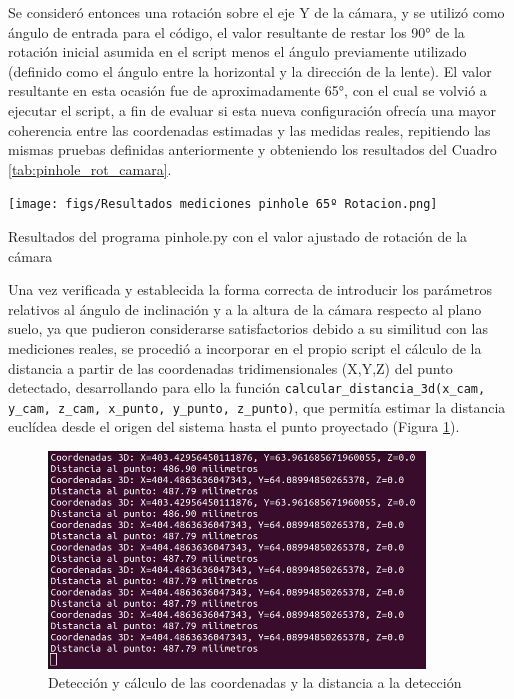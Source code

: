 Se consideró entonces una rotación sobre el eje Y de la cámara, y se utilizó como ángulo de entrada para el código, el valor resultante de restar los 90° de la rotación inicial asumida en el script menos el ángulo previamente utilizado (definido como el ángulo entre la horizontal y la dirección de la lente). El valor resultante en esta ocasión fue de aproximadamente 65°, con el cual se volvió a ejecutar el script, a fin de evaluar si esta nueva configuración ofrecía una mayor coherencia entre las coordenadas estimadas y las medidas reales, repitiendo las mismas pruebas definidas anteriormente y obteniendo los resultados del Cuadro \ref{tab:pinhole_rot_camara}.

   \begin{table}[H]
   \centering
   \begin{center}
     \texttt{[image: figs/Resultados mediciones pinhole 65º Rotacion.png]}
   \end{center}
   \caption{Resultados del programa pinhole.py con el valor ajustado de rotación de la cámara}
   \label{tab:pinhole_rot_camara}
  \end{table}
  
Una vez verificada y establecida la forma correcta de introducir los parámetros relativos al ángulo de inclinación y a la altura de la cámara respecto al plano suelo, ya que pudieron considerarse satisfactorios debido a su similitud con las mediciones reales, se procedió a incorporar en el propio script el cálculo de la distancia a partir de las coordenadas tridimensionales (X,Y,Z) del punto detectado, desarrollando para ello la función \texttt{calcular\_distancia\_3d(x\_cam, y\_cam, z\_cam, x\_punto, y\_punto, z\_punto)}, que permitía estimar la distancia euclídea desde el origen del sistema hasta el punto proyectado (Figura \ref{fig:dist_camara}). 

   \begin{figure}[H]
    \begin{center}
      \subcapcentertrue
      \includegraphics[width=100mm]{figs/Deteccion puntos y distancia EJE X_TERMINAL.png}
    \end{center}
    \caption{Detección y cálculo de las coordenadas y la distancia a la detección}
    \label{fig:dist_camara}
  \end{figure}


